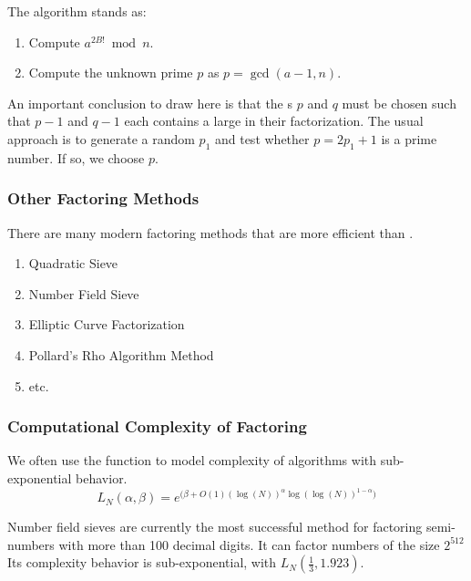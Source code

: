 The algorithm stands as:
\begin{enumerate}[noitemsep]
\item Compute $a^{2B!} \bmod n$.
\item Compute the unknown prime $p$ as $p = \gcd(a-1, n)$.
\end{enumerate}

An important conclusion to draw here is that the s $p$ and $q$ must be chosen such that $p-1$ and $q-1$ each contains a large  in their factorization.
The usual approach is to generate a random  $p_{1}$ and test whether $p = 2p_{1} + 1$ is a prime number.
If so, we choose $p$.

\subsubsection{Other Factoring Methods}\label{subsubsec:Other_Factoring_Methods}
There are many modern factoring methods that are more efficient than .
\begin{enumerate}[noitemsep]
\item Quadratic Sieve
\item Number Field Sieve
\item Elliptic Curve Factorization
\item Pollard's Rho Algorithm Method
\item etc.
\end{enumerate}

\subsubsection{Computational Complexity of Factoring}\label{subsubsec:Factoring_Computational_Complexity}
We often use the function to model complexity of algorithms with sub-exponential behavior.
\begin{equation}\label{eq:Sub_Exponential_Behavior}
  L_{N}(\alpha, \beta) = e^{\bigl( \beta + O(1){(\log(N))}^{\alpha} {\log(\log(N))}^{1-\alpha}\bigr)}
\end{equation}

Number field sieves are currently the most successful method for factoring semi- numbers with more than 100 decimal digits.
It can factor numbers of the size $2^{512}$
Its complexity behavior is sub-exponential, with $L_{N}(\frac{1}{3}, 1.923)$.

